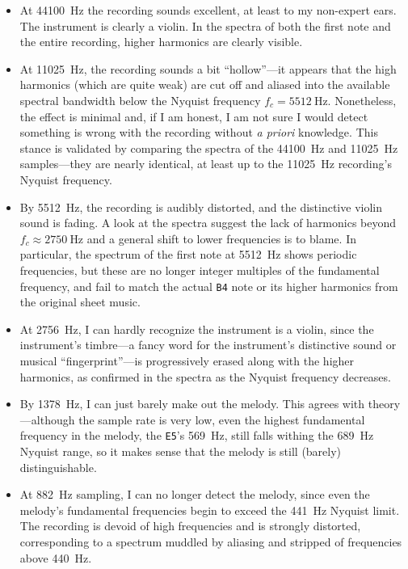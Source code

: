\documentclass[11pt, a4paper]{article}
\begin{document}
\begin{itemize}
	\item At \SI{44100}{\hertz} the recording sounds excellent, at least to my non-expert ears. The instrument is clearly a violin. In the spectra of both the first note and the entire recording, higher harmonics are clearly visible.
	
	\item At \SI{11025}{\hertz}, the recording sounds a bit ``hollow''---it appears that the high harmonics (which are quite weak) are cut off and aliased into the available spectral bandwidth below the Nyquist frequency $ f_{c} = \SI{5512}{\hertz} $. Nonetheless, the effect is minimal and, if I am honest, I am not sure I would detect something is wrong with the recording without \textit{a priori} knowledge. This stance is validated by comparing the spectra of the \SI{44100}{\hertz} and \SI{11025}{\hertz} samples---they are nearly identical, at least up to the \SI{11025}{\hertz} recording's Nyquist frequency.
	
	\item By \SI{5512}{\hertz}, the recording is audibly distorted, and the distinctive violin sound is fading. A look at the spectra suggest the lack of harmonics beyond $  f_{c}  \approx \SI{2750}{\hertz} $ and a general shift to lower frequencies is to blame. In particular, the spectrum of the first note at \SI{5512}{\hertz} shows periodic frequencies, but these are no longer integer multiples of the fundamental frequency, and fail to match the actual \texttt{B4} note or its higher harmonics from the original sheet music.
	
	\item At \SI{2756}{\hertz}, I can hardly recognize the instrument is a violin, since the instrument's timbre---a fancy word for the instrument's distinctive sound or musical ``fingerprint''---is progressively erased along with the higher harmonics, as confirmed in the spectra as the Nyquist frequency decreases.
	
	\item By \SI{1378}{\hertz}, I can just barely make out the melody. This agrees with theory---although the sample rate is very low, even the highest fundamental frequency in the melody, the \texttt{E5}'s \SI{569}{\hertz}, still falls withing the \SI{689}{\hertz} Nyquist range, so it makes sense that the melody is still (barely) distinguishable.
	
	\item At \SI{882}{\hertz} sampling, I can no longer detect the melody, since even the melody's fundamental frequencies begin to exceed the \SI{441}{\hertz} Nyquist limit. The recording is devoid of high frequencies and is strongly distorted, corresponding to a spectrum muddled by aliasing and stripped of frequencies above \SI{440}{\hertz}. 
	
\end{itemize} 
\end{document}
